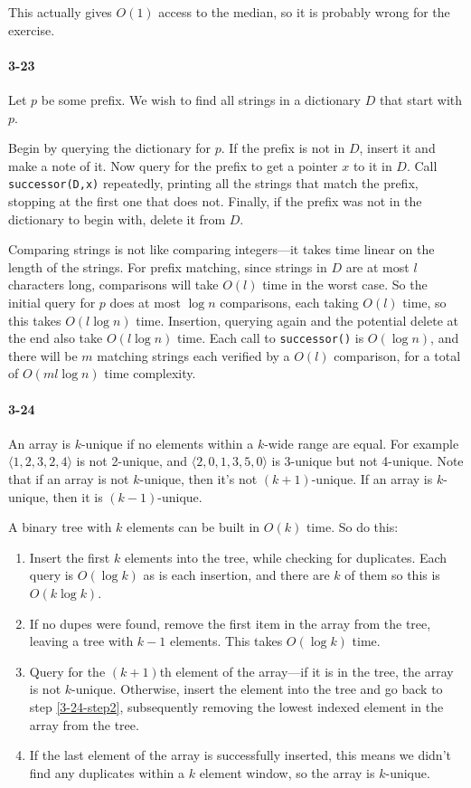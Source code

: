 \documentclass{report}
\begin{document}
This actually gives $O(1)$ access to the median, so it is probably wrong for the exercise.

\paragraph{3-23} Let $p$ be some prefix. We wish to find all strings in a dictionary $D$ that start with $p$.

Begin by querying the dictionary for $p$. If the prefix is not in $D$, insert it and make a note of it. Now query for the prefix to get a pointer $x$ to it in $D$. Call \lstinline!successor(D,x)! repeatedly, printing all the strings that match the prefix, stopping at the first one that does not. Finally, if the prefix was not in the dictionary to begin with, delete it from $D$.

Comparing strings is not like comparing integers---it takes time linear on the length of the strings. For prefix matching, since strings in $D$ are at most $l$ characters long, comparisons will take $O(l)$ time in the worst case. So the initial query for $p$ does at most $\log n$ comparisons, each taking $O(l)$ time, so this takes $O(l\log n)$ time. Insertion, querying again and the potential delete at the end also take $O(l\log n)$ time. Each call to \lstinline!successor()! is $O(\log n)$, and there will be $m$ matching strings each verified by a $O(l)$ comparison, for a total of $O(ml\log n)$ time complexity.

\paragraph{3-24} An array is $k$-unique if no elements within a $k$-wide range are equal. For example $\langle1,2,3,2,4\rangle$ is not 2-unique, and $\langle2,0,1,3,5,0\rangle$ is 3-unique but not 4-unique. Note that if an array is not $k$-unique, then it's not $(k+1)$-unique. If an array is $k$-unique, then it is $(k-1)$-unique.

A binary tree with $k$ elements can be built in $O(k)$ time. So do this:
\begin{enumerate}[label=\arabic*)]
	\item Insert the first $k$ elements into the tree, while checking for duplicates. Each query is $O(\log k)$ as is each insertion, and there are $k$ of them so this is $O(k\log k)$.
	\item If no dupes were found, remove the first item in the array from the tree, leaving a tree with $k-1$ elements. This takes $O(\log k)$ time. \label{3-24-step2}
	\item Query for the $(k+1)$th element of the array---if it is in the tree, the array is not $k$-unique. Otherwise, insert the element into the tree and go back to step \ref{3-24-step2}, subsequently removing the lowest indexed element in the array from the tree.
	\item If the last element of the array is successfully inserted, this means we didn't find any duplicates within a $k$ element window, so the array is $k$-unique.
\end{enumerate}
\end{document}
